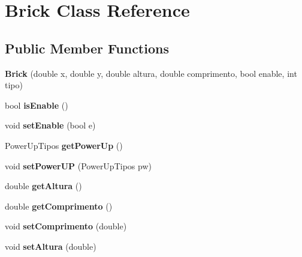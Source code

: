 \hypertarget{classBrick}{\section{\-Brick \-Class \-Reference}
\label{classBrick}
}
\subsection*{\-Public \-Member \-Functions}
\begin{DoxyCompactItemize}
\item 
\hypertarget{classBrick_a578027ce8028b8e29c018a654fbb6db7}{{\bfseries \-Brick} (double x, double y, double altura, double comprimento, bool enable, int tipo)}\label{classBrick_a578027ce8028b8e29c018a654fbb6db7}

\item 
\hypertarget{classBrick_adc0468d78a1041d703bd28835f2205d9}{bool {\bfseries is\-Enable} ()}\label{classBrick_adc0468d78a1041d703bd28835f2205d9}

\item 
\hypertarget{classBrick_a334baedfa658293087b2e6b5c7df0180}{void {\bfseries set\-Enable} (bool e)}\label{classBrick_a334baedfa658293087b2e6b5c7df0180}

\item 
\hypertarget{classBrick_a24d61a6c440e7b964c7741ec82400ea7}{\-Power\-Up\-Tipos {\bfseries get\-Power\-Up} ()}\label{classBrick_a24d61a6c440e7b964c7741ec82400ea7}

\item 
\hypertarget{classBrick_a955a4422c60b8461c984c7b7a5cfc949}{void {\bfseries set\-Power\-U\-P} (\-Power\-Up\-Tipos pw)}\label{classBrick_a955a4422c60b8461c984c7b7a5cfc949}

\item 
\hypertarget{classBrick_a3c70b1c24c0195ca8dc459aa29555891}{double {\bfseries get\-Altura} ()}\label{classBrick_a3c70b1c24c0195ca8dc459aa29555891}

\item 
\hypertarget{classBrick_aa7f97b8ef65355a739da1b1f5d529f97}{double {\bfseries get\-Comprimento} ()}\label{classBrick_aa7f97b8ef65355a739da1b1f5d529f97}

\item 
\hypertarget{classBrick_a08645c586d53cc3fa814963201ca8f26}{void {\bfseries set\-Comprimento} (double)}\label{classBrick_a08645c586d53cc3fa814963201ca8f26}

\item 
\hypertarget{classBrick_a15677b8dc43bb8d665ef26597b1e1561}{void {\bfseries set\-Altura} (double)}\label{classBrick_a15677b8dc43bb8d665ef26597b1e1561}


\end{DoxyCompactItemize}
